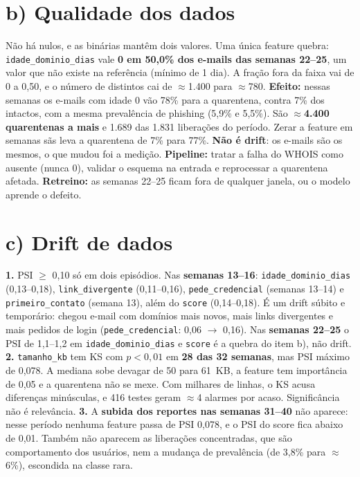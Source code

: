 \documentclass[10pt,a4paper]{article}
\newcommand{\code}[1]{\texttt{\small #1}}
\begin{document}
\section*{b) Qualidade dos dados}
Não há nulos, e as binárias mantêm dois valores. Uma única feature quebra: \code{idade\_dominio\_dias} vale \textbf{0 em 50,0\% dos e-mails das semanas 22--25}, um valor que não existe na referência (mínimo de 1 dia). A fração fora da faixa vai de 0 a 0,50, e o número de distintos cai de $\approx$1.400 para $\approx$780.
\textbf{Efeito:} nessas semanas os e-mails com idade 0 vão 78\% para a quarentena, contra 7\% dos intactos, com a mesma prevalência de phishing (5,9\% e 5,5\%). São $\approx$\textbf{4.400 quarentenas a mais} e 1.689 das 1.831 liberações do período. Zerar a feature em semanas sãs leva a quarentena de 7\% para 77\%.
\textbf{Não é drift}: os e-mails são os mesmos, o que mudou foi a medição. \textbf{Pipeline:} tratar a falha do WHOIS como ausente (nunca 0), validar o esquema na entrada e reprocessar a quarentena afetada. \textbf{Retreino:} as semanas 22--25 ficam fora de qualquer janela, ou o modelo aprende o defeito.

\section*{c) Drift de dados}
\textbf{1.} PSI $\geq$ 0,10 só em dois episódios. Nas \textbf{semanas 13--16}: \code{idade\_dominio\_dias} (0,13--0,18), \code{link\_divergente} (0,11--0,16), \code{pede\_credencial} (semanas 13--14) e \code{primeiro\_contato} (semana 13), além do \code{score} (0,14--0,18). É um drift súbito e temporário: chegou e-mail com domínios mais novos, mais links divergentes e mais pedidos de login (\code{pede\_credencial}: 0,06 $\to$ 0,16). Nas \textbf{semanas 22--25} o PSI de 1,1--1,2 em \code{idade\_dominio\_dias} e \code{score} é a quebra do item b), não drift.
\textbf{2.} \code{tamanho\_kb} tem KS com $p<0{,}01$ em \textbf{28 das 32 semanas}, mas PSI máximo de 0,078. A mediana sobe devagar de 50 para 61~KB, a feature tem importância de 0,05 e a quarentena não se mexe. Com milhares de linhas, o KS acusa diferenças minúsculas, e 416 testes geram $\approx$4 alarmes por acaso. Significância não é relevância.
\textbf{3.} A \textbf{subida dos reportes nas semanas 31--40} não aparece: nesse período nenhuma feature passa de PSI 0,078, e o PSI do score fica abaixo de 0,01. Também não aparecem as liberações concentradas, que são comportamento dos usuários, nem a mudança de prevalência (de 3,8\% para $\approx$6\%), escondida na classe rara.
\end{document}
